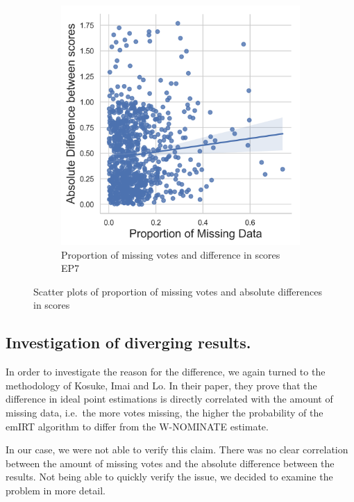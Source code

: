 \documentclass[a4paper,12pt]{report}
\begin{document}
\begin{figure}[H]
\begin{subfigure}[b]{0.48\textwidth}
            \includegraphics[width=\textwidth]{Graphs/missingvsdiff8}
            \caption{Proportion of missing votes and difference in scores EP7}
            \label{fig:missingscatter8}
        \end{subfigure}
        \caption{Scatter plots of proportion of missing votes and absolute differences in scores}
        \label{fig:missingscatters}
    \end{figure}

    \subsection{Investigation of diverging results.}\label{subsec:investigation-of-diverging-results.}
    In order to investigate the reason for the difference, we again turned to the methodology of Kosuke, Imai and
    Lo. In their paper, they prove that the difference in ideal point estimations is directly correlated with the
    amount of missing data, i.e.\ the more votes missing, the higher the probability of the emIRT algorithm to differ
    from the W-NOMINATE estimate.

    In our case, we were not able to verify this claim.
    There was no clear correlation between the amount of missing
    votes and the absolute difference between the results.
    Not being able to quickly verify the issue, we decided to
    examine the problem in more detail.
\end{document}
